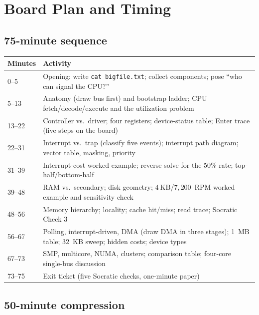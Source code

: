 \documentclass[11pt]{article}
\begin{document}
\section{Board Plan and Timing}

\subsection*{75-minute sequence}

\begin{center}
\small
\begin{tabular}{@{}p{1.8cm}p{13.3cm}@{}}
\toprule
\textbf{Minutes} & \textbf{Activity} \\
\midrule
0--5   & Opening: write \texttt{cat bigfile.txt}; collect components; pose
         ``who can signal the CPU?'' \\
5--13  & Anatomy (draw bus first) and bootstrap ladder; CPU fetch/decode/execute
         and the utilization problem \\
13--22 & Controller vs.\ driver; four registers; device-status table; Enter trace
         (five steps on the board) \\
22--31 & Interrupt vs.\ trap (classify five events); interrupt path diagram;
         vector table, masking, priority \\
31--39 & Interrupt-cost worked example; reverse solve for the 50\% rate;
         top-half/bottom-half \\
39--48 & RAM vs.\ secondary; disk geometry; $4\ \text{KB}$/$7{,}200$~RPM worked
         example and sensitivity check \\
48--56 & Memory hierarchy; locality; cache hit/miss; read trace; Socratic
         Check 3 \\
56--67 & Polling, interrupt-driven, DMA (draw DMA in three stages); 1~MB table;
         32~KB sweep; hidden costs; device types \\
67--73 & SMP, multicore, NUMA, clusters; comparison table; four-core single-bus
         discussion \\
73--75 & Exit ticket (five Socratic checks, one-minute paper) \\
\bottomrule
\end{tabular}
\end{center}

\subsection*{50-minute compression}
\end{document}
